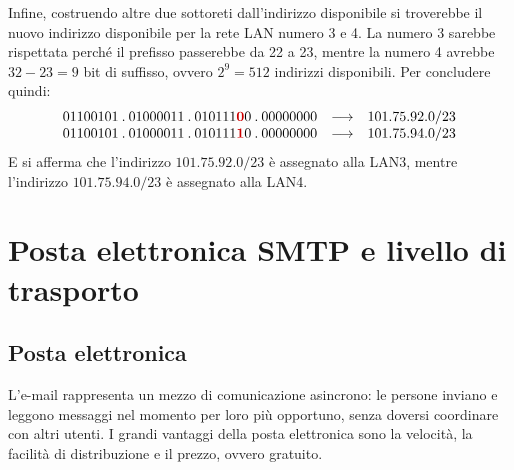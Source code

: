 \documentclass[a4paper]{article}
\newcommand{\binaryaddresspointed}[4]{#1\:.\:#2\:.\:#3\:.\:#4}
\begin{document}
	\noindent
	Infine, costruendo altre due sottoreti dall’indirizzo disponibile si troverebbe il nuovo indirizzo disponibile per la rete LAN numero 3 e 4. La numero 3 sarebbe rispettata perché il prefisso passerebbe da 22 a 23, mentre la numero 4 avrebbe $32-23=9$ bit di suffisso, ovvero $2^{9}=512$ indirizzi disponibili.\newline
	Per concludere quindi:
	\begin{equation*}
		\begin{array}{lll}
			\binaryaddresspointed{01100101}{01000011}{010111\textcolor{Red3}{\boldsymbol{0}}0}{00000000} & \longrightarrow & 101.75.92.0/23 \\
			\binaryaddresspointed{01100101}{01000011}{010111\textcolor{Red3}{\boldsymbol{1}}0}{00000000} & \longrightarrow & 101.75.94.0/23
		\end{array}
	\end{equation*}
	E si afferma che l’indirizzo $101.75.92.0/23$ è assegnato alla LAN3, mentre l’indirizzo $101.75.94.0/23$ è assegnato alla LAN4.
	
	\newpage
	
	\section{Posta elettronica SMTP e livello di trasporto}
	
	\subsection{Posta elettronica}
	
	L’e-mail rappresenta un mezzo di comunicazione asincrono: le persone inviano e leggono messaggi nel momento per loro più opportuno, senza doversi coordinare con altri utenti. I grandi vantaggi della posta elettronica sono la velocità, la facilità di distribuzione e il prezzo, ovvero gratuito.\newline
	
\end{document}
